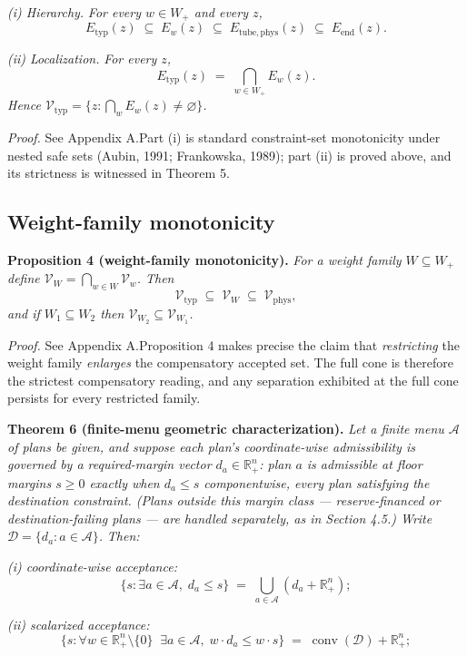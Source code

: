\documentclass[3p,11pt]{elsarticle}
\begin{document}
\emph{(i) Hierarchy.} \emph{For every \(w \in W_+\) and every \(z\),}
\[E_{\mathrm{typ}}(z) \;\subseteq\; E_w(z) \;\subseteq\; E_{\mathrm{tube,phys}}(z) \;\subseteq\; E_{\mathrm{end}}(z).\]

\emph{(ii) Localization.} \emph{For every \(z\),}
\[E_{\mathrm{typ}}(z) \;=\; \bigcap_{w \in W_+} E_w(z).\] \emph{Hence
\(\mathcal{V}_{\mathrm{typ}} = \{ z : \bigcap_w E_w(z) \neq \varnothing \}\).}

\emph{Proof.} See Appendix A.Part (i) is standard constraint-set monotonicity under nested safe sets (Aubin, 1991; Frankowska, 1989); part (ii) is proved above, and its strictness is witnessed in Theorem 5.

\subsection{Weight-family
monotonicity}\label{weight-family-monotonicity}

\textbf{Proposition 4 (weight-family monotonicity).} \emph{For a weight
family \(W \subseteq W_+\) define
\(\mathcal{V}_W = \bigcap_{w \in W} \mathcal{V}_w\). Then}
\[\mathcal{V}_{\mathrm{typ}} \;\subseteq\; \mathcal{V}_W \;\subseteq\; \mathcal{V}_{\mathrm{phys}},\]
\emph{and if \(W_1 \subseteq W_2\) then
\(\mathcal{V}_{W_2} \subseteq \mathcal{V}_{W_1}\).}

\emph{Proof.} See Appendix A.Proposition 4 makes precise the claim that \emph{restricting} the weight
family \emph{enlarges} the compensatory accepted set. The full cone is
therefore the strictest compensatory reading, and any separation
exhibited at the full cone persists for every restricted family.

\textbf{Theorem 6 (finite-menu geometric characterization).} \emph{Let a
finite menu \(\mathcal{A}\) of plans be given, and suppose each plan's
coordinate-wise admissibility is governed by a required-margin vector
\(d_a \in \mathbb{R}^n_+\): plan \(a\) is admissible at floor margins
\(s \ge 0\) exactly when \(d_a \le s\) componentwise, every plan
satisfying the destination constraint. (Plans outside this margin class
--- reserve-financed or destination-failing plans --- are handled
separately, as in Section 4.5.) Write \(\mathcal{D} = \{d_a : a \in \mathcal{A}\}\).}
\emph{Then:}

\emph{(i) coordinate-wise acceptance:}
\[
\{ s : \exists a \in \mathcal{A},\; d_a \le s \}
\;=\; \bigcup_{a \in \mathcal{A}} (d_a + \mathbb{R}^n_+);
\]

\emph{(ii) scalarized acceptance:}
\[
\{ s : \forall w \in \mathbb{R}^n_+ \setminus \{0\} \;\; \exists a \in
\mathcal{A},\; w \cdot d_a \le w \cdot s \}
\;=\; \operatorname{conv}(\mathcal{D}) + \mathbb{R}^n_+;
\]
\end{document}
